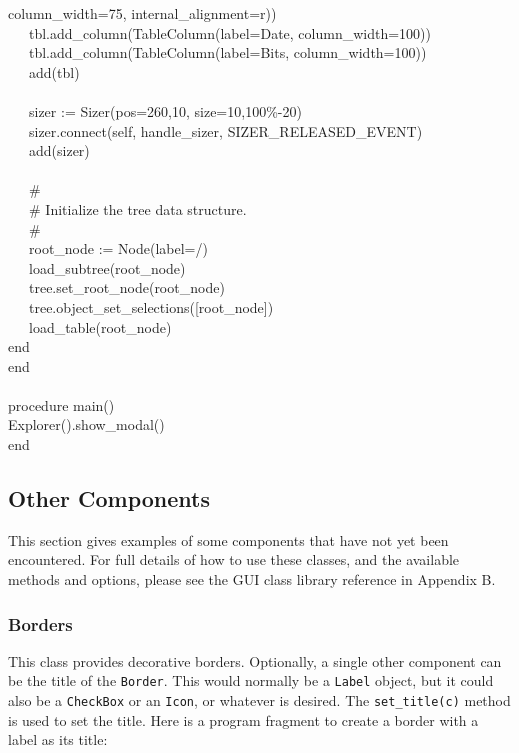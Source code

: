 {{\textquotedbl}column\_width=75{\textquotedbl},
{\textquotedbl}internal\_alignment=r{\textquotedbl})) \\
\>   \ \ \ tbl.add\_column(TableColumn({\textquotedbl}label=Date{\textquotedbl},
{\textquotedbl}column\_width=100{\textquotedbl})) \\
\>   \ \ \ tbl.add\_column(TableColumn({\textquotedbl}label=Bits{\textquotedbl},
{\textquotedbl}column\_width=100{\textquotedbl})) \\
\>   \ \ \ add(tbl) \\
\ \\
\>   \ \ \ sizer := Sizer({\textquotedbl}pos=260,10{\textquotedbl},
{\textquotedbl}size=10,100\%-20{\textquotedbl}) \\
\>   \ \ \ sizer.connect(self,
{\textquotedbl}handle\_sizer{\textquotedbl}, SIZER\_RELEASED\_EVENT) \\
\>   \ \ \ add(sizer) \\
\ \\
\>   \ \ \ \# \\
\>   \ \ \ \# Initialize the tree data structure. \\
\>   \ \ \ \# \\
\>   \ \ \ root\_node := Node({\textquotedbl}label=/{\textquotedbl}) \\
\>   \ \ \ load\_subtree(root\_node) \\
\>   \ \ \ tree.set\_root\_node(root\_node) \\
\>   \ \ \ tree.object\_set\_selections([root\_node]) \\
\>   \ \ \ load\_table(root\_node) \\
\>   end \\
end \\
\ \\
procedure main() \\
\>   Explorer().show\_modal() \\
end
}

\subsection{Other Components}

This section gives examples of some components that have not yet been
encountered. For full details of how to use these classes, and the
available methods and options, please see the GUI class library
reference in Appendix B.

\subsubsection[Borders]{Borders}
This class provides decorative borders. Optionally, a single other
component can be the title of the \texttt{Border}. This would normally
be a \texttt{Label} object, but it could also be a \texttt{CheckBox} or
an \texttt{Icon}, or whatever is desired. The \texttt{set\_title(c)}
method is used to set the title. Here is a program fragment to create a
border with a label as its title:

